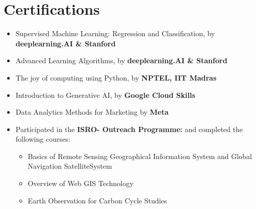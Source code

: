 \documentclass[10.8pt, a4paper]{extarticle}
\newcommand{\shorterSection}[1]{\vspace{-10pt}\section{#1}}
\begin{document}
\shorterSection{Certifications}
\begin{itemize}

\item Supervised Machine Learning: Regression and Classification, by \textbf{deeplearning.AI \& Stanford } \href{https://www.coursera.org/account/accomplishments/certificate/TECTFLUN93UC}{\faLink{}}\\[-0.6cm]

\item Advanced Learning Algorithms, by \textbf{deeplearning.AI \& Stanford } \href{https://www.coursera.org/account/accomplishments/certificate/PLNJXZ9JXVXJ}{\faLink{}}\\[-0.6cm]

\item The joy of computing using Python, by \textbf{NPTEL, IIT Madras }  \href{https://drive.google.com/file/d/1-0Q_gA_cl3bb7sPyZOA3OtV0fbmRLQvz/view?usp=sharing}{\faLink{}}\\[-0.6cm]

\item Introduction to Generative AI, by \textbf{Google Cloud Skills }\href{https://www.cloudskillsboost.google/public_profiles/76755a5d-f18b-4787-89db-bd6be0b3e066/badges/4178524}{\faLink{}}\\[-0.6cm]

\item Data Analytics Methods for Marketing by \textbf{Meta}\href{https://www.coursera.org/account/accomplishments/certificate/JPUQ5DJBDZN6}{\faLink{}}\\[-0.6cm]

\item Participated in the \textbf{ISRO- Outreach Programme:}  and completed the following courses: 
\begin{itemize}
    \item Basics of Remote Sensing Geographical Information System and Global Navigation SatelliteSystem \href{https://drive.google.com/file/d/15E-FXqYPGD-uRhFIRUu4WKobbqnBvlAh/view?usp=sharing}{\faLink{}}
    
    \item Overview of Web GIS Technology \href{https://drive.google.com/file/d/1bQc-tYUv5at-NuImsrSm_pfTs4rRgWi2/view?usp=drive_link}{\faLink{}}
    
    \item Earth Observation for Carbon Cycle Studies \href{https://drive.google.com/file/d/1SYKP6BzNcmPcVS8MiXt31NDexVP9gFDn/view?usp=sharing}{\faLink{}}
    
\end{itemize} 

\vspace{4mm}
\end{itemize}
\vspace{4mm}
\end{document}
